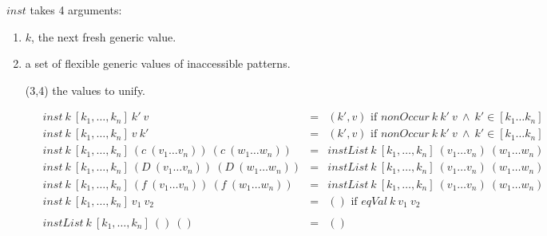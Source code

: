 $inst$ takes 4 arguments:

\begin{enumerate}
  \item $k$, the next fresh generic value.
  \item a set of flexible generic values of inaccessible patterns.
  \item [(3,4)] the values to unify.
\end{enumerate}

\begin{figure}[H]
  \begin{equation*}
    \begin{aligned}
      inst \: k \: [k_1,\dots,k_n] \: k' \: v                                            & =              & (k', v) \textrm{ if } nonOccur \: k \: k' \: v \: \land \: k' \in [k_1 \dots k_n]                                                                                 \\
      inst \: k \: [k_1,\dots,k_n] \: v \: k'                                            & =              & (k', v) \textrm{ if } nonOccur \: k \: k' \: v \: \land \: k' \in [k_1 \dots k_n]                                                                                 \\
      inst \: k \: [k_1,\dots,k_n] \: (c \: (v_1 \dots v_n)) \: (c \: (w_1 \dots w_n))   & =              & instList \: k \: [k_1,\dots,k_n] \: (v_1 \dots v_n) \: (w_1 \dots w_n)                                                                                            \\
      inst \: k \: [k_1,\dots,k_n] \: (D \: (v_1 \dots v_n)) \: (D \: (w_1 \dots w_n))   & =              & instList \: k \: [k_1,\dots,k_n] \: (v_1 \dots v_n) \: (w_1 \dots w_n)                                                                                            \\
      inst \: k \: [k_1,\dots,k_n] \: (f \: (v_1 \dots v_n)) \: (f \: (w_1 \dots w_n))   & =              & instList \: k \: [k_1,\dots,k_n] \: (v_1 \dots v_n) \: (w_1 \dots w_n)                                                                                            \\
      inst \: k \: [k_1,\dots,k_n] \: v_1 \: v_2                                         & =              & () \textrm{ if } eqVal \: k \: v_1 \: v_2                                                                                                                         \\
      \\
      instList \: k \: [k_1,\dots,k_n] \: () \: ()                                       & =              & ()                                                                                                                                                                \\

\end{aligned}
\end{equation*}
\end{figure}
